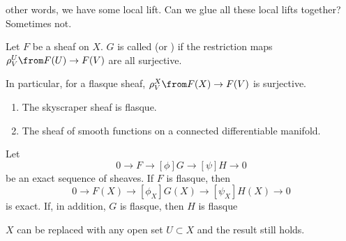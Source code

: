 \documentclass[11pt,leqno,oneside]{amsbook}
\renewcommand{\F}{F} %
\newcommand{\G}{G}
\renewcommand{\H}{H}
\numberwithin{thm}{section}
\begin{document}
other words, we have some local lift. Can we glue all these local
lifts together? Sometimes not. 
\begin{defn}
  Let \(\F\) be a sheaf on \(X\). \(\G\) is called  (or
  ) if the restriction maps \(\rho^U_V \from \F(U) \to
  \F(V)\) are all surjective.
\end{defn}
In particular, for a flasque sheaf, \(\rho^X_V \from \F(X) \to \F(V)\)
is surjective.
\begin{examples}
  \begin{enumerate}
  \item The skyscraper sheaf is flasque.
  \item {} The sheaf of smooth functions on a connected
    differentiable manifold. 
  \end{enumerate}
\end{examples}
\begin{thm}
  Let \[
    0 \to \F \to[\phi] \G \to[\psi] \H \to 0
  \]
  be an exact sequence of sheaves. If \(\F\) is flasque, then \[
    0 \to \F(X) \to[\phi_X] \G(X) \to[\psi_X] \H(X) \to 0
  \]
  is exact. If, in addition, \(\G\) is flasque, then \(\H\) is flasque
\end{thm}
\begin{rmk}
  \(X\) can be replaced with any open set \(U \subset X\) and the
  result still holds.
\end{rmk}
\end{document}
